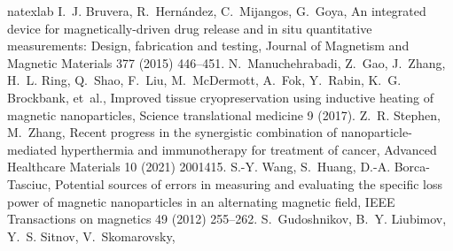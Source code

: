 \documentclass[preprint,12pt]{elsarticle}
\begin{document}
\begin{thebibliography}{15}
\expandafter\ifx\csname natexlab\endcsname\relax\def\natexlab#1{#1}\fi
\providecommand{\bibinfo}[2]{#2}
\ifx\xfnm\relax \def\xfnm[#1]{\unskip,\space#1}\fi
\bibinfo{author}{I.~J. Bruvera}, \bibinfo{author}{R.~Hern{\'a}ndez},
  \bibinfo{author}{C.~Mijangos}, \bibinfo{author}{G.~Goya},
\newblock \bibinfo{title}{An integrated device for magnetically-driven drug
  release and in situ quantitative measurements: Design, fabrication and
  testing},
\newblock \bibinfo{journal}{Journal of Magnetism and Magnetic Materials}
  \bibinfo{volume}{377} (\bibinfo{year}{2015}) \bibinfo{pages}{446--451}.
\bibinfo{author}{N.~Manuchehrabadi}, \bibinfo{author}{Z.~Gao},
  \bibinfo{author}{J.~Zhang}, \bibinfo{author}{H.~L. Ring},
  \bibinfo{author}{Q.~Shao}, \bibinfo{author}{F.~Liu},
  \bibinfo{author}{M.~McDermott}, \bibinfo{author}{A.~Fok},
  \bibinfo{author}{Y.~Rabin}, \bibinfo{author}{K.~G. Brockbank}, et~al.,
\newblock \bibinfo{title}{Improved tissue cryopreservation using inductive
  heating of magnetic nanoparticles},
\newblock \bibinfo{journal}{Science translational medicine} \bibinfo{volume}{9}
  (\bibinfo{year}{2017}).
\bibinfo{author}{Z.~R. Stephen}, \bibinfo{author}{M.~Zhang},
\newblock \bibinfo{title}{Recent progress in the synergistic combination of
  nanoparticle-mediated hyperthermia and immunotherapy for treatment of
  cancer},
\newblock \bibinfo{journal}{Advanced Healthcare Materials} \bibinfo{volume}{10}
  (\bibinfo{year}{2021}) \bibinfo{pages}{2001415}.
\bibinfo{author}{S.-Y. Wang}, \bibinfo{author}{S.~Huang},
  \bibinfo{author}{D.-A. Borca-Tasciuc},
\newblock \bibinfo{title}{Potential sources of errors in measuring and
  evaluating the specific loss power of magnetic nanoparticles in an
  alternating magnetic field},
\newblock \bibinfo{journal}{IEEE Transactions on magnetics}
  \bibinfo{volume}{49} (\bibinfo{year}{2012}) \bibinfo{pages}{255--262}.
\bibinfo{author}{S.~Gudoshnikov}, \bibinfo{author}{B.~Y. Liubimov},
  \bibinfo{author}{Y.~S. Sitnov}, \bibinfo{author}{V.~Skomarovsky},

\end{thebibliography}
\end{document}
